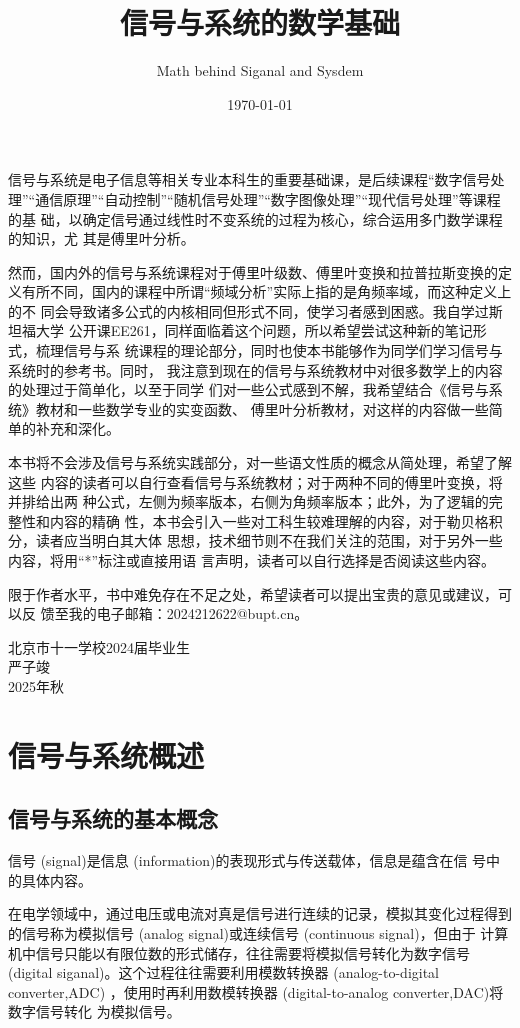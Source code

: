 \documentclass{ctexbook}
\title{信号与系统的数学基础}
\author{Math behind Siganal and Sysdem}
\date{\today}
\begin{document}
\maketitle{}%
\frontmatter%
信号与系统是电子信息等相关专业本科生的重要基础课，是后续课程“数字信号处
理”“通信原理”“自动控制”“随机信号处理”“数字图像处理”“现代信号处理”等课程的基
础，以确定信号通过线性时不变系统的过程为核心，综合运用多门数学课程的知识，尤
其是傅里叶分析。

然而，国内外的信号与系统课程对于傅里叶级数、傅里叶变换和拉普拉斯变换的定
义有所不同，国内的课程中所谓“频域分析”实际上指的是角频率域，而这种定义上的不
同会导致诸多公式的内核相同但形式不同，使学习者感到困惑。我自学过斯坦福大学
公开课EE261，同样面临着这个问题，所以希望尝试这种新的笔记形式，梳理信号与系
统课程的理论部分，同时也使本书能够作为同学们学习信号与系统时的参考书。同时，
我注意到现在的信号与系统教材中对很多数学上的内容的处理过于简单化，以至于同学
们对一些公式感到不解，我希望结合《信号与系统》教材和一些数学专业的实变函数、
傅里叶分析教材，对这样的内容做一些简单的补充和深化。

本书将不会涉及信号与系统实践部分，对一些语文性质的概念从简处理，希望了解这些
内容的读者可以自行查看信号与系统教材；对于两种不同的傅里叶变换，将并排给出两
种公式，左侧为频率版本，右侧为角频率版本；此外，为了逻辑的完整性和内容的精确
性，本书会引入一些对工科生较难理解的内容，对于勒贝格积分，读者应当明白其大体
思想，技术细节则不在我们关注的范围，对于另外一些内容，将用“*”标注或直接用语
言声明，读者可以自行选择是否阅读这些内容。

限于作者水平，书中难免存在不足之处，希望读者可以提出宝贵的意见或建议，可以反
馈至我的电子邮箱：2024212622@bupt.cn。

{
\raggedleft{}
北京市十一学校2024届毕业生\\
严子竣\\
2025年秋\\
}
\tableofcontents%
\mainmatter%
\chapter{信号与系统概述}%
\section{信号与系统的基本概念}
信号 (signal)是信息 (information)的表现形式与传送载体，信息是蕴含在信
号中的具体内容。

在电学领域中，通过电压或电流对真是信号进行连续的记录，模拟其变化过程得到
的信号称为模拟信号 (analog signal)或连续信号 (continuous signal)，但由于
计算机中信号只能以有限位数的形式储存，往往需要将模拟信号转化为数字信号
(digital siganal)。这个过程往往需要利用模数转换器 (analog-to-digital converter,ADC)
，使用时再利用数模转换器 (digital-to-analog converter,DAC)将数字信号转化
为模拟信号。
\end{document}

